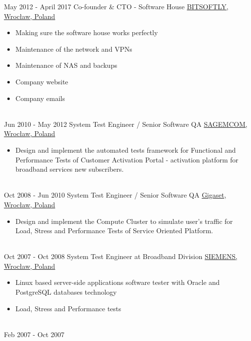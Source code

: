 \documentclass[letterpaper]{tenseconds} %
\begin{document}
\begin{twenty}
	\twentyitem
        {May 2012 -}
        {April 2017}
        {Co-founder \& CTO - Software House}
        {\href{https://www.bitsoftly.com}{BITSOFTLY, Wrocław, Poland}}
        {}
        {\begin{itemize}
        \item Making sure the software house works perfectly
        \item Maintenance of the network and VPNs
        \item Maintenance of NAS and backups
        \item Company website
        \item Company emails
        \end{itemize}}
        \\
	\twentyitem
        {Jun 2010 -}
        {May 2012}
        {System Test Engineer / Senior Software QA}
        {\href{https://www.sagemcom.com/}{SAGEMCOM, Wrocław, Poland}}
        {}
        {\begin{itemize}
        \item Design and implement the automated tests framework for Functional and Performance Tests of Customer Activation Portal - activation platform for broadband services new subscribers.
        \end{itemize}}
        \\
	\twentyitem
        {Oct 2008 -}
        {Jun 2010}
        {System Test Engineer / Senior Software QA}
        {\href{https://www.gigaset.com/}{Gigaset, Wrocław, Poland}}
        {}
        {\begin{itemize}
        \item Design and implement the Compute Cluster to simulate user's traffic for Load, Stress and Performance Tests of Service Oriented Platform.
        \end{itemize}}
        \\
    \twentyitem
        {Oct 2007 -}
        {Oct 2008}
        {System Test Engineer at Broadband Division}
        {\href{https://www.siemens.com/}{SIEMENS, Wrocław, Poland}}
        {}
        {
        {\begin{itemize}
        \item Linux based server-side applications software tester with Oracle and PostgreSQL databases technology
        \item Load, Stress and Performance tests
        \end{itemize}}
        }
    \\   
    \twentyitem
        {Feb 2007 -}
        {Oct 2007}

\end{twenty}
\end{document}
